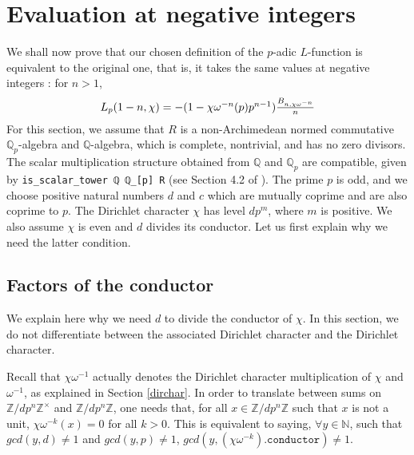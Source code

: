 \documentclass[a4paper,UKenglish,cleveref, autoref, thm-restate]{lipics-v2021}
\newcommand{\lean}[1]{\texttt{#1}\xspace} %
\begin{document}
\section{Evaluation at negative integers}
\label{section4}
We shall now prove that our chosen definition of the $p$-adic $L$-function is equivalent to the original one, that is, 
it takes the same values at negative integers : for $n > 1$,
\begin{equation}\label{eqn:1}
  $$ L_p (1 - n, \chi) = -(1 - \chi \omega^{-n}(p)p^{n - 1}) \frac{B_{n, \chi \omega^{-n}}}{n} $$
\end{equation}
For this section, we assume that $R$ is a non-Archimedean normed commutative $\mathbb{Q}_p$-algebra and $\mathbb{Q}$-algebra, 
which is complete, nontrivial, and has no zero divisors. The scalar multiplication structure obtained from $\mathbb{Q}$ 
and $\mathbb{Q}_p$ are compatible, given by \lean{is\_scalar\_tower ℚ ℚ\_[p] R} (see Section 4.2 of \cite{DD}). 
The prime $p$ is odd, and we choose positive natural numbers $d$ and $c$ which are mutually coprime and are also coprime to 
$p$. The Dirichlet character $\chi$ has level $d p^m$, where $m$ is positive. We also assume $\chi$ is even and $d$ divides 
its conductor. Let us first explain why we need the latter condition.

\subsection{Factors of the conductor}
We explain here why we need $d$ to divide the conductor of $\chi$. In this section, we do not differentiate between the associated Dirichlet 
character and the Dirichlet character. 

Recall that $\chi \omega^{-1}$ actually denotes the Dirichlet 
character multiplication of $\chi$ and $\omega^{-1}$, as explained in Section \ref{dirchar}. %
In order to translate between sums on $\mathbb{Z}/ d p^n \mathbb{Z} ^{\times}$ and $\mathbb{Z}/ d p^n \mathbb{Z}$, one needs that, for all $x \in \mathbb{Z}/ d p^n \mathbb{Z}$ 
such that $x$ is not a unit, $\chi \omega^{-k} (x) = 0$ for all $k > 0$. This is equivalent to saying, $\forall y \in \mathbb{N}$, such that 
$gcd (y, d) \ne 1$ and $gcd (y, p) \ne 1$, $gcd (y, (\chi \omega^{-k})\texttt{.conductor}) \ne 1$. 
\end{document}
